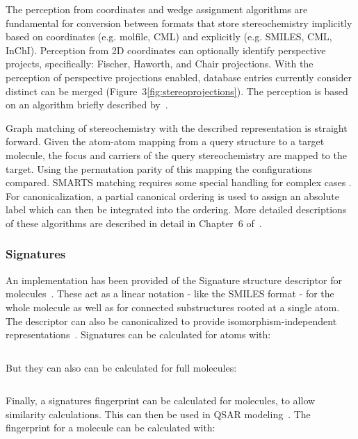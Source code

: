\documentclass[10pt]{bmcart}
\begin{document}
  The perception from coordinates and wedge assignment algorithms are fundamental for conversion
  between formats that store stereochemistry implicitly based on coordinates (e.g. molfile, CML) and 
  explicitly (e.g. SMILES, CML, InChI). Perception from 2D coordinates can optionally identify
  perspective projects, specifically: Fischer, Haworth, and Chair projections. With the perception of 
  perspective projections enabled, database entries currently consider distinct can be merged
  (Figure~3\ref{fig:stereoprojections}). The perception is based on an algorithm briefly 
  described by~\cite{Karapetyan2015}.


  Graph matching of stereochemistry with the described representation is straight forward. Given
  the atom-atom mapping from a query structure to a target molecule, the focus and carriers of 
  the query stereochemistry are mapped to the target. Using the permutation parity of this mapping
  the configurations compared. SMARTS matching requires some special handling for complex cases 
  \cite{May2014_SMARTS}. For canonicalization, a partial canonical ordering is used to assign an 
  absolute label which can then be integrated into the ordering. More detailed descriptions of 
  these algorithms are described in detail in Chapter~6 of~\cite{May2015}.

  \subsubsection*{Signatures}

  An implementation has been provided of the Signature structure descriptor for
  molecules~\cite{Faulon2003}. These act as a linear notation - like the SMILES format - 
  for the whole molecule as well as for connected substructures rooted at a single atom. The 
  descriptor can also be canonicalized to provide isomorphism-independent
  representations~\cite{Faulon2004}. Signatures can be calculated for atoms with:

\begin{verbatim}
\end{verbatim}

  But they can also can be calculated for full molecules:

\begin{verbatim}
\end{verbatim}

  Finally, a signatures fingerprint can be calculated for molecules, to allow
  similarity calculations. This can then be used in QSAR modeling~\cite{signaturefingerprints,
  Spjuth2011DS,Moghadam2015,Alvarsson2014,Spjuth2012OS,Norinder2013,Alvarsson2016}.
  The fingerprint for a molecule can be calculated with:
\end{document}

